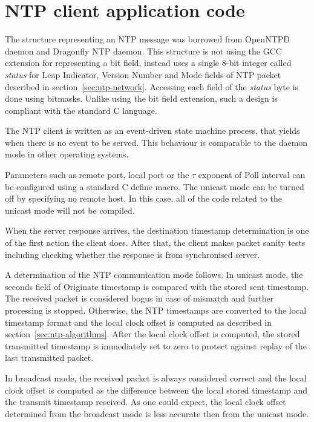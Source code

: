 
\section{NTP client application code}
The structure representing an NTP message was borrowed from OpenNTPD daemon
and Dragonfly NTP daemon.
This structure is not using the GCC extension for representing a bit field,
instead uses a single 8-bit integer called {\it{status}}
for Leap Indicator, Version Number and Mode fields of NTP packet
described in section~\ref{sec:ntp-network}.
Accessing each field of the {\it{status}} byte is done using bitmasks.
Unlike using the bit field extension,
such a design is compliant with the standard C language.

The NTP client is written as an event-driven state machine process,
that yields when there is no event to be served.
This behaviour is comparable to the daemon mode in other operating systems.

Parameters such as remote port, local port or the $\tau$ exponent of Poll interval
can be configured using a standard C define macro.
The unicast mode can be turned off by specifying no remote host.
In this case, all of the code related to the unicast mode will not be compiled.


When the server response arrives,
the destination timestamp determination is one of the first action the client does.
After that, the client makes packet sanity tests including
checking whether the response is from synchronised server.

A determination of the NTP communication mode follows.
In unicast mode, the seconds field of Originate timestamp
is compared with the stored sent timestamp.
The received packet is considered bogus in case of mismatch and further processing is stopped.
Otherwise, the NTP timestamps are converted to the local timestamp format and
the local clock offset is computed as described in section~\ref{sec:ntp-algorithms}.
After the local clock offset is computed,
the stored transmitted timestamp is immediately set to zero
to protect against replay of the last transmitted packet.

In broadcast mode, the received packet is always considered correct
and the local clock offset is computed as the difference between the local stored timestamp
and the transmit timestamp received.
As one could expect, the local clock offset determined from the broadcast mode
is less accurate then from the unicast mode.




